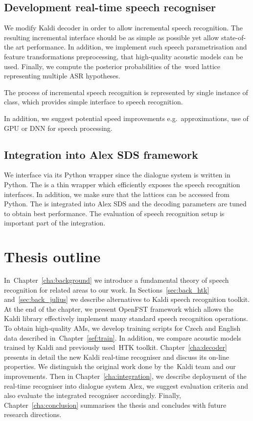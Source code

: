 \subsection{Development real-time speech recogniser} 
\label{sub:compare_rt}

We modify Kaldi  decoder in order to allow incremental speech recognition.
The resulting incremental interface should be as simple as possible yet allow state-of-the art performance.
In addition, we implement such speech parametrisation and feature transformations preprocessing, that high-quality acoustic models can be used.
Finally, we compute the posterior probabilities of the~word lattice representing multiple \ac{ASR} hypotheses.

The process of incremental speech recognition is represented by single instance of  class,
which provides simple interface to speech recognition.

In addition, we suggest potential speed improvements e.g.\ approximations, use of \ac{GPU} 
or \ac{DNN} for speech processing\cite{vesely2013sequencediscriminative}.

\subsection[Integration into Alex \acs{SDS} framework]{Integration into Alex \acl{SDS} framework} 
\label{sub:integration}
We interface  via its Python wrapper since the dialogue system is written in Python.
The  is a thin wrapper which efficiently exposes the speech recognition interfaces.
In addition, we make sure that the lattices can be accessed from Python.
The  is integrated into Alex \ac{SDS} and the decoding parameters are tuned to obtain best performance.
The evaluation of speech recognition setup is important part of the integration.

\section*{Thesis outline} 
In~Chapter~\ref{cha:background} we introduce a fundamental theory of speech recognition for related areas to our work.
In Sections~\ref{sec:back_htk} and~\ref{sec:back_julius} we describe alternatives to Kaldi speech recognition toolkit. 
At the end of the chapter, we present OpenFST framework which allows the Kaldi library effectively implement many standard speech recognition operations. 
To obtain high-quality \aclp{AM}, we develop training scripts for Czech and English data described in~Chapter~\ref{sef:train}. 
In addition, we compare acoustic models trained by Kaldi and previously used~\ac{HTK} toolkit. 
Chapter~\ref{cha:decoder} presents in detail the new Kaldi real-time recogniser and discuss its on-line properties.
We distinguish the original work done by the~Kaldi team and our improvements. 
Then in Chapter~\ref{cha:integration}, we describe deployment of the real-time recogniser into dialogue system Alex, we suggest evaluation criteria and also evaluate the integrated recogniser accordingly.
Finally, Chapter~\ref{cha:conclusion} summarises the thesis and concludes with future research directions.
